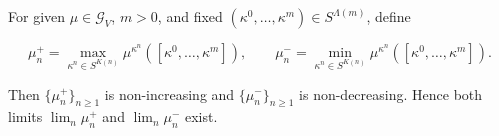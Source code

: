 For given $\mu \in \mathcal{G}_V$, $m > 0$, and fixed $(\kappa^0, \ldots, \kappa^m) \in S^{\Lambda(m)}$, define

$$
\mu_n^+ = \max_{\kappa^n \in S^{K(n)}} \mu^{\kappa^n}([\kappa^0, \ldots, \kappa^m]),
\qquad
\mu_n^- = \min_{\kappa^n \in S^{K(n)}} \mu^{\kappa^n}([\kappa^0, \ldots, \kappa^m]).
$$

Then $\{\mu_n^+\}_{n \geq 1}$ is non-increasing and $\{\mu_n^-\}_{n \geq 1}$ is non-decreasing. Hence both limits $\lim_n \mu_n^+$ and $\lim_n \mu_n^-$ exist.
